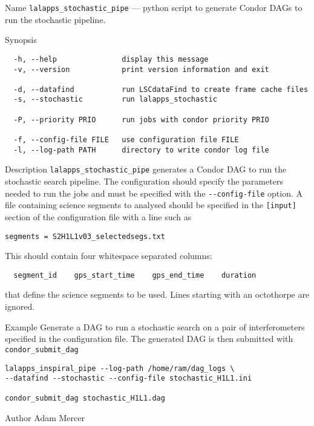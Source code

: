 \begin{entry}
\item[Name]
\verb$lalapps_stochastic_pipe$ --- python script to generate Condor DAGs
to run the stochastic pipeline.

\item[Synopsis]
\begin{verbatim}
  -h, --help               display this message
  -v, --version            print version information and exit

  -d, --datafind           run LSCdataFind to create frame cache files
  -s, --stochastic         run lalapps_stochastic

  -P, --priority PRIO      run jobs with condor priority PRIO

  -f, --config-file FILE   use configuration file FILE
  -l, --log-path PATH      directory to write condor log file
\end{verbatim}

\item[Description] \verb$lalapps_stochastic_pipe$ generates a Condor DAG
to run the stochastic search pipeline. The configuration should specify
the parameters needed to run the jobs and must be specified with the
\verb$--config-file$ option. A file containing science segments to
analysed should be specified in the \verb$[input]$ section of the
configuration file with a line such as
\begin{verbatim}
segments = S2H1L1v03_selectedsegs.txt
\end{verbatim}
This should contain four whitespace separated columns:
\begin{verbatim}
  segment_id    gps_start_time    gps_end_time    duration
\end{verbatim}
that define the science segments to be used. Lines starting with an
octothorpe are ignored.

\item[Example]
Generate a DAG to run a stochastic search on a pair of interferometers
specified in the configuration file. The generated DAG is then submitted
with \texttt{condor\_submit\_dag}
\begin{verbatim}
lalapps_inspiral_pipe --log-path /home/ram/dag_logs \
--datafind --stochastic --config-file stochastic_H1L1.ini

condor_submit_dag stochastic_H1L1.dag
\end{verbatim}

\item[Author]
Adam Mercer
\end{entry}

